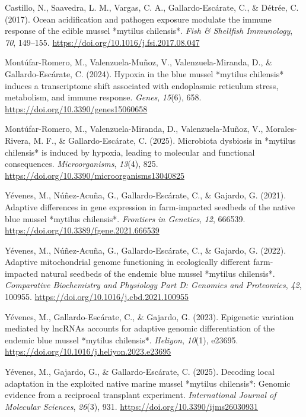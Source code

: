 \documentclass[
]{agujournal2019}
\newlength{\cslhangindent}
\newenvironment{CSLReferences}[2] %
 {\begin{list}{}{%
  \setlength{\itemindent}{0pt}
  \setlength{\leftmargin}{0pt}
  \setlength{\parsep}{0pt}
  \ifodd #1
   \setlength{\leftmargin}{\cslhangindent}
   \setlength{\itemindent}{-1\cslhangindent}
  \fi
  \setlength{\itemsep}{#2\baselineskip}}}
 {\end{list}}
\begin{document}
\begin{CSLReferences}{1}{0}
Castillo, N., Saavedra, L. M., Vargas, C. A., Gallardo-Escárate, C., \&
Détrée, C. (2017). Ocean acidification and pathogen exposure modulate
the immune response of the edible mussel *mytilus chilensis*. \emph{Fish
\& Shellfish Immunology}, \emph{70}, 149--155.
\url{https://doi.org/10.1016/j.fsi.2017.08.047}

Montúfar-Romero, M., Valenzuela-Muñoz, V., Valenzuela-Miranda, D., \&
Gallardo-Escárate, C. (2024). Hypoxia in the blue mussel *mytilus
chilensis* induces a transcriptome shift associated with endoplasmic
reticulum stress, metabolism, and immune response. \emph{Genes},
\emph{15}(6), 658. \url{https://doi.org/10.3390/genes15060658}

Montúfar-Romero, M., Valenzuela-Miranda, D., Valenzuela-Muñoz, V.,
Morales-Rivera, M. F., \& Gallardo-Escárate, C. (2025). Microbiota
dysbiosis in *mytilus chilensis* is induced by hypoxia, leading to
molecular and functional consequences. \emph{Microorganisms},
\emph{13}(4), 825. \url{https://doi.org/10.3390/microorganisms13040825}

Yévenes, M., Núñez-Acuña, G., Gallardo-Escárate, C., \& Gajardo, G.
(2021). Adaptive differences in gene expression in farm-impacted
seedbeds of the native blue mussel *mytilus chilensis*. \emph{Frontiers
in Genetics}, \emph{12}, 666539.
\url{https://doi.org/10.3389/fgene.2021.666539}

Yévenes, M., Núñez-Acuña, G., Gallardo-Escárate, C., \& Gajardo, G.
(2022). Adaptive mitochondrial genome functioning in ecologically
different farm-impacted natural seedbeds of the endemic blue mussel
*mytilus chilensis*. \emph{Comparative Biochemistry and Physiology Part
D: Genomics and Proteomics}, \emph{42}, 100955.
\url{https://doi.org/10.1016/j.cbd.2021.100955}

Yévenes, M., Gallardo-Escárate, C., \& Gajardo, G. (2023). Epigenetic
variation mediated by lncRNAs accounts for adaptive genomic
differentiation of the endemic blue mussel *mytilus chilensis*.
\emph{Heliyon}, \emph{10}(1), e23695.
\url{https://doi.org/10.1016/j.heliyon.2023.e23695}

Yévenes, M., Gajardo, G., \& Gallardo-Escárate, C. (2025). Decoding
local adaptation in the exploited native marine mussel *mytilus
chilensis*: Genomic evidence from a reciprocal transplant experiment.
\emph{International Journal of Molecular Sciences}, \emph{26}(3), 931.
\url{https://doi.org/10.3390/ijms26030931}

\end{CSLReferences}
\end{document}
